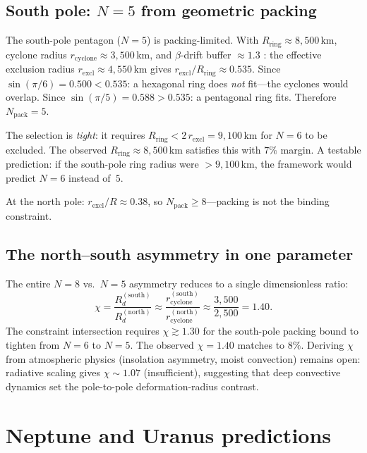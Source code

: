 \subsection{South pole: $N = 5$ from geometric packing}

The south-pole pentagon ($N = 5$) is packing-limited.
With $R_{\mathrm{ring}} \approx 8{,}500$\,km,
cyclone radius $r_{\mathrm{cyclone}} \approx 3{,}500$\,km, and
$\beta$-drift buffer $\approx 1.3$ \citep{Gavriel2021}:
the effective exclusion radius
$r_{\mathrm{excl}} \approx 4{,}550$\,km gives
$r_{\mathrm{excl}}/R_{\mathrm{ring}} \approx 0.535$.
Since $\sin(\pi/6) = 0.500 < 0.535$: a hexagonal ring does
\emph{not} fit---the cyclones would overlap.
Since $\sin(\pi/5) = 0.588 > 0.535$: a pentagonal ring fits.
Therefore $N_{\mathrm{pack}} = 5$.

The selection is \emph{tight}: it requires
$R_{\mathrm{ring}} < 2\,r_{\mathrm{excl}} = 9{,}100$\,km
for $N = 6$ to be excluded.  The observed
$R_{\mathrm{ring}} \approx 8{,}500$\,km satisfies this with
$7\%$ margin.  A testable prediction: if the south-pole ring
radius were $> 9{,}100$\,km, the framework would predict $N = 6$
instead of~$5$.

At the north pole: $r_{\mathrm{excl}}/R \approx 0.38$,
so $N_{\mathrm{pack}} \ge 8$---packing is not the binding
constraint.

\subsection{The north--south asymmetry in one parameter}

The entire $N = 8$ vs.\ $N = 5$ asymmetry reduces to a single
dimensionless ratio:
\[
  \chi = \frac{R_d^{(\mathrm{south})}}{R_d^{(\mathrm{north})}}
  \approx \frac{r_{\mathrm{cyclone}}^{(\mathrm{south})}}
              {r_{\mathrm{cyclone}}^{(\mathrm{north})}}
  \approx \frac{3{,}500}{2{,}500} = 1.40.
\]
The constraint intersection requires $\chi \gtrsim 1.30$
for the south-pole packing bound to tighten from $N = 6$ to
$N = 5$.  The observed $\chi = 1.40$ matches to $8\%$.
Deriving $\chi$ from atmospheric physics (insolation asymmetry,
moist convection) remains open: radiative scaling gives
$\chi \sim 1.07$ (insufficient), suggesting that deep convective
dynamics set the pole-to-pole deformation-radius contrast.

\section{Neptune and Uranus predictions}
\label{sec:neptune}


